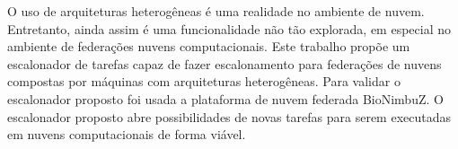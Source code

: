
O uso de arquiteturas heterogêneas é uma realidade no ambiente de nuvem. Entretanto, ainda assim é uma funcionalidade não tão explorada, em especial no ambiente de federações nuvens computacionais. Este trabalho propõe um escalonador de tarefas capaz de fazer escalonamento para federações de nuvens compostas por máquinas com arquiteturas heterogêneas. Para validar o escalonador proposto foi usada a plataforma de nuvem federada BioNimbuZ. O escalonador proposto abre possibilidades de novas tarefas para serem executadas em nuvens computacionais de forma viável.

